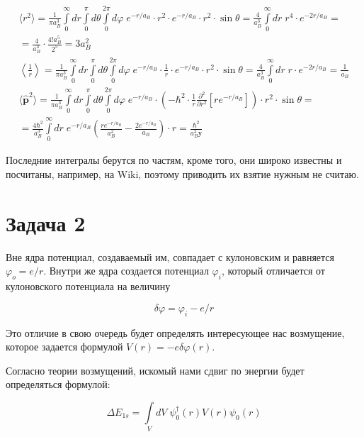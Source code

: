 \documentclass[a4paper, 12pt]{article}
\renewcommand{\phi}{\varphi} %
\begin{document}
\begin{align*}
	\langle r^2 \rangle = \frac{1}{\pi a_B^3} \int\limits_{0}^{\infty} dr \int\limits_{0}^{\pi} d\theta \int\limits_{0}^{2\pi} d\phi \; e^{-r / a_B} \cdot r^2 \cdot e^{-r / a_B} \cdot r^2 \cdot \sin \theta  = \frac{4}{a^3_B} \int\limits_0^\infty dr \; r^4 \cdot e^{-2r / a_B} = \\
	= \frac{4}{a_B^3} \cdot \frac{4! a_B^5}{2^5} = \boxed{3 a_B^2}\\
	\left \langle \frac{1}{r} \right \rangle = \frac{1}{\pi a_B^3} \int\limits_{0}^{\infty} dr \int\limits_{0}^{\pi} d\theta \int\limits_{0}^{2\pi} d\phi \; e^{-r / a_B} \cdot \frac{1}{r} \cdot e^{-r / a_B} \cdot r^2 \cdot \sin \theta = \frac{4}{a_B^3} \int\limits_0^\infty dr \; r \cdot e^{-2r / a_B} = \boxed{\frac{1}{a_B}}\\
	\langle \hat{\mathbf{p}}^2 \rangle = \frac{1}{\pi a_B^3} \int\limits_{0}^{\infty} dr \int\limits_{0}^{\pi} d\theta \int\limits_{0}^{2\pi} d\phi \; e^{-r / a_B} \cdot \left(-\hbar^2 \cdot  \frac{1}{r} \frac{\partial^2}{\partial r^2} \left[r e^{-r / a_B}\right]\right)  \cdot r^2 \cdot \sin \theta = \\
	= \frac{4 \hbar^2}{a_B^3} \int\limits_0^\infty dr \; e^{-r/a_B}\left(\frac{r e^{-r/a_B}}{a_B^2}-\frac{2 e^{-r/a_B}}{a_B}\right) \cdot r = \boxed{\frac{\hbar^2}{a_B^2у}}
\end{align*}

Последние интегралы берутся по частям, кроме того, они широко известны и посчитаны, например, на Wiki, поэтому приводить их взятие нужным не считаю.
	
\section*{Задача 2}

Вне ядра потенциал, создаваемый им, совпадает с кулоновским и равняется $\phi_o = e / r$. Внутри же ядра создается потенциал $\phi_i$, который отличается от кулоновского потенциала на величину

\begin{equation}
	\delta \phi = \phi_i - e / r
	\label{eq:delta_phi}
\end{equation}

Это отличие в свою очередь будет определять интересующее нас возмущение, которое задается формулой $V(r) = - e \delta \phi (r)$.

Согласно теории возмущений, искомый нами сдвиг по энергии будет определяться формулой:

\begin{equation*}
	\Delta E_{1s} = \int\limits_V dV \; \psi_0^\dagger(r) V(r) \psi_0(r)
\end{equation*}
\end{document}
